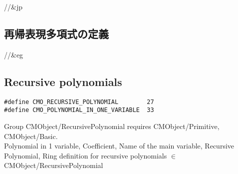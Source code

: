 //&jp \subsection{再帰表現多項式の定義} 
//&eg \subsection{Recursive polynomials} 

\begin{verbatim}
#define CMO_RECURSIVE_POLYNOMIAL        27
#define CMO_POLYNOMIAL_IN_ONE_VARIABLE  33
\end{verbatim}

Group CMObject/RecursivePolynomial requires CMObject/Primitive, CMObject/Basic.\\
Polynomial in 1 variable, Coefficient, Name of the main variable,
Recursive Polynomial, Ring definition for recursive polynomials
$\in$ CMObject/RecursivePolynomial \\

